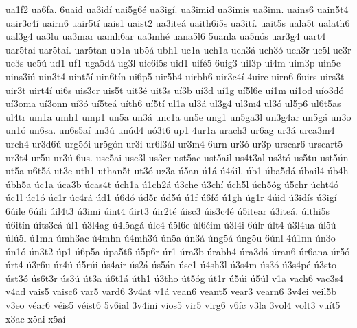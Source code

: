 {ua1f2
ua6fa.
6uaid
ua3id^^ed
uai5g6^^e9
ua3ig^^ed.
ua3imid
ua3imis
ua3inn.
uains6
uain5t4
uair3c4^^ed
uairn6
uair5t^^ed
uais1
uaist2
ua3ite^^e1
uaith6i5s
ua3it^^ed.
uait5s
uala5t
ualath6
ual3g4
ua3lu
ua3mar
uamh6ar
ua3mh^^e9
uana5l6
5uanla
ua5n^^f3s
uar3g4
uart4
uar5tai
uar5ta^^ed.
uar5tan
ub1a
ub5^^e1
ubh1
uc1a
uch1a
uch3^^e1
uch3^^f3
uch3r
uc5l
uc3r
uc3s
uc5^^fa
ud1
uf1
uga5d^^e1
ug3l
uic6i5s
uid1
uif^^e95
6uig3
uil3p
ui4m
uim3p
uin5c
uins3i^^fa
uin3t4
uint5^^ed
uin6t^^edn
ui6p5
uir5b4
uirbh6
uir3c4^^ed
4uire
uirn6
6uirs
uirs3t
uir3t
uirt4^^ed
ui6s
uis3cr
uis5t
uit3^^e9
uit3s
u^^ed3b
u^^ed3d
u^^ed1g
u^^ed5l6e
u^^ed1m
u^^ed1od
u^^edo3d^^f3
u^^ed3oma
u^^ed3onn
u^^ed3^^f3
u^^ed5te^^e1
u^^edth6
u^^ed5t^^ed
ul1a
ul3^^e1
ul3g4
ul3m4
ul3^^f3
ul5p6
ul6t5as
ul4tr
um1a
umh1
ump1
un5a
un3^^e1
unc1a
un5e
ung1
un5ga3l
un3g4ar
un5g^^e1
un3o
un1^^f3
un6sa.
un6s5a^^ed
un3^^fa
un^^fad4
u^^f33t6
up1
4ur1a
urach3
ur6ag
ur3^^e1
urca3m4
urch4
ur3d6^^fa
urg5^^f3i
ur5g^^f3n
ur3i
ur6l3^^e1l
ur3m4
6urn
ur3^^f3
ur3p
urscar6
urscart5
ur3t4
ur5u
ur3^^fa
6us.
usc5ai
usc3l
us3cr
ust5ac
ust5ail
us4t3al
us3t^^f3
us5tu
ust5^^fan
ut5a
u6t5^^e1
ut3e
uth1
uthan5t
ut3^^f3
uz3a
^^fa5an
^^fa1^^e1
^^fa4^^e1il.
^^fab1
^^faba5d^^e1
^^fabail4
^^fab4h
^^fabh5a
^^fac1a
^^faca3b
^^facas4t
^^fach1a
^^fa1ch2^^e1
^^fa3che
^^fa3ch^^ed
^^fach5l
^^fach5^^f3g
^^fa5chr
^^facht4^^f3
^^fac1l
^^fac1^^f3
^^fac1r
^^fac4r^^e1
^^fad1
^^fa6d^^f3
^^fad5r
^^fad5^^fa
^^fa1f
^^fa6f^^f3
^^fa1gh
^^fag1r
4^^faid
^^fa3id^^eds
^^fa3ig^^ed
6^^faile
6^^faili
^^fail4t3
^^fa3imi
^^faint4
^^fairt3
^^fair2t^^e9
^^faisc3
^^fais3c4^^e9
^^fa5itear
^^fa3ite^^e1.
^^faithi5s
^^fa6it^^edn
^^faits3e^^e1
^^fal1
^^fa3l4ag
^^fa4l5ag^^e1
^^falc4
^^fa5l6e
^^fal6^^e9im
^^fa3l4i
6^^falr
^^falt4
^^fa3l4ua
^^fal5^^fa
^^fal^^fa5l
^^fa1mh
^^famh3ac
^^fa4mhn
^^fa4mh3^^fa
^^fan5a
^^fan3^^e1
^^fang5^^e1
^^fang5u
6^^fanl
4^^fa1nn
^^fan3o
^^fan1^^f3
^^fan3t2
^^fap1
^^fa6p5a
^^fapa5t6
^^fa5p6r
^^far1
^^fara3b
^^farabh4
^^fara3d^^e1
^^faran6
^^far6ana
^^far5^^f3
^^fart4
^^fa3r6u
^^far4^^fa
^^fa5r^^fai
^^fas4air
^^fas2^^e1
^^fas5^^e1n
^^fasc1
^^fa4sh3l
^^fa3s4m
^^fas3^^f3
^^fa3s4p^^e9
^^fa3sto
^^fast3^^f3
^^fas6t3r
^^fas3^^fa
^^fat3a
^^fa6t1^^e1
^^fath1
^^fa3tho
^^fat5^^f3g
^^fat1r
^^fa5^^fai
^^fa5^^fal
v1a
vach6
vac3s4
v4ad
vais5
vaisc6
var5
vard6
3v4at
v1^^e1
vean6
veant5
vear3
vearn6
3v4ei
veil5b
v3eo
v^^e9ar6
v^^e9is5
v^^e9ist6
5v6ial
3v4ini
vios5
vir5
virg6
v6^^edc
v3la
3vol4
volt3
vu^^edt5
x3ac
x5ai
x5a^^ed
}

